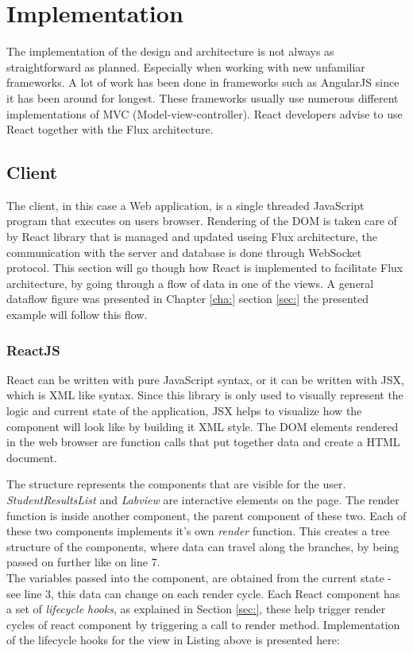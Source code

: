 \chapter{Implementation}\label{cha:implementation}
The implementation of the design and architecture is not always as straightforward as planned. Especially when working with new unfamiliar frameworks. A lot of work has been done in frameworks such as AngularJS since it has been around for longest. These frameworks usually use numerous different implementations of MVC (Model-view-controller). React developers advise to use React together with the Flux architecture.
\section{Client}\label{sec:client}
The client, in this case a Web application, is a single threaded JavaScript program that executes on users browser. Rendering of the DOM is taken care of by React library that is managed and updated useing Flux architecture, the communication with the server and database is done through WebSocket protocol. This section will go though how React is implemented to facilitate Flux architecture, by going through a flow of data in one of the views. A general dataflow figure was presented in Chapter \ref{cha:} section \ref{sec:} the presented example will follow this flow.
\subsection{ReactJS}\label{sec:reactjs}
React can be written with pure JavaScript syntax, or it can be written with JSX, which is XML like syntax. Since this library is only used to visually represent the logic and current state of the application, JSX helps to visualize how the component will look like by building it XML style. The DOM elements rendered in the web browser are function calls that put together data and create a HTML document.



The structure represents the components that are visible for the user. \emph{StudentResultsList} and \emph{Labview} are interactive elements on the page. The render function is inside another component, the parent component of these two. Each of these two components implements it's own \emph{render} function. This creates a tree structure of the components, where data can travel along the branches, by being passed on further like on line 7.
\\The variables passed into the component, are obtained from the current state - see line 3, this data can change on each render cycle. Each React component has a set of \emph{lifecycle hooks}, as explained in Section \ref{sec:}, these help trigger render cycles of react component by triggering a call to render method. Implementation of the lifecycle hooks for the view in Listing above is presented here:

